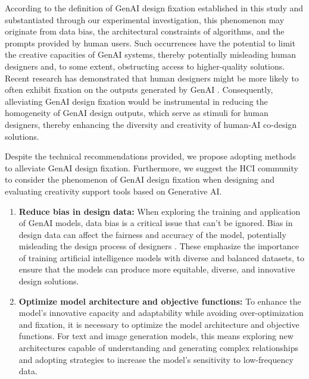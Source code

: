 According to the definition of GenAI design fixation established in this study and substantiated through our experimental investigation, this phenomenon may originate from data bias, the architectural constraints of algorithms, and the prompts provided by human users. Such occurrences have the potential to limit the creative capacities of GenAI systems, thereby potentially misleading human designers and, to some extent, obstructing access to higher-quality solutions. Recent research has demonstrated that human designers might be more likely to often exhibit fixation on the outputs generated by GenAI \cite{wadinambiarachchi2024effects}. Consequently, alleviating GenAI design fixation would be instrumental in reducing the homogeneity of GenAI design outputs, which serve as stimuli for human designers, thereby enhancing the diversity and creativity of human-AI co-design solutions.

Despite the technical recommendations provided, we propose adopting methods to alleviate GenAI design fixation. Furthermore, we suggest the HCI community to consider the phenomenon of GenAI design fixation when designing and evaluating creativity support tools based on Generative AI.

\begin{enumerate}
    \item \textbf{Reduce bias in design data:} When exploring the training and application of GenAI models, data bias is a critical issue that can't be ignored. Bias in design data can affect the fairness and accuracy of the model, potentially misleading the design process of designers \cite{zhou2024bias, ferrara2023should}. These emphasize the importance of training artificial intelligence models with diverse and balanced datasets, to ensure that the models can produce more equitable, diverse, and innovative design solutions.
    \item \textbf{Optimize model architecture and objective functions:} To enhance the model's innovative capacity and adaptability while avoiding over-optimization and fixation, it is necessary to optimize the model architecture and objective functions. For text and image generation models, this means exploring new architectures capable of understanding and generating complex relationships and adopting strategies to increase the model's sensitivity to low-frequency data.
\end{enumerate}


